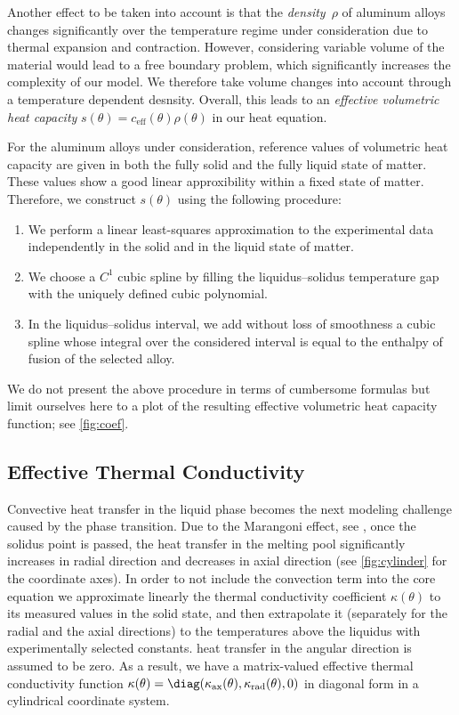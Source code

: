 Another effect to be taken into account is that the \emph{density}~$\rho$ of aluminum alloys changes significantly over the temperature regime under consideration due to thermal expansion and contraction.
However, considering variable volume of the material would lead to a free boundary problem, which significantly increases the complexity of our model.
We therefore take volume changes into account through a temperature dependent desnsity.
Overall, this leads to an \emph{effective volumetric heat capacity} $s(\theta) = c_\text{eff}(\theta) \rho(\theta)$ in our heat equation.

For the aluminum alloys under consideration, reference values of volumetric heat capacity are given in both the fully solid and the fully liquid state of matter. 
These values show a good linear approxibility within a fixed state of matter. 
Therefore, we construct $s(\theta)$ using the following procedure:
\begin{enumerate}
	\item 
		We perform a linear least-squares approximation to the experimental data independently in the solid and in the liquid state of matter.
	\item 
		We choose a $C^1$ cubic spline by filling the liquidus--solidus temperature gap with the uniquely defined cubic polynomial.
	\item 
		In the liquidus--solidus interval, we add without loss of smoothness a cubic spline whose integral over the considered interval is equal to the enthalpy of fusion of the selected alloy.
\end{enumerate}

We do not present the above procedure in terms of cumbersome formulas but limit ourselves here to a plot of the resulting effective volumetric heat capacity function; see \cref{fig:coef}.


\subsection{Effective Thermal Conductivity}
\label{subsec:conductivity}

Convective heat transfer in the liquid phase becomes the next modeling challenge caused by the phase transition. 
Due to the Marangoni effect, see \cite{MillsKeeneBrooksShirali:1998:1,Saldi:2012:1}, once the solidus point is passed, the heat transfer in the melting pool significantly increases in radial direction and decreases in axial direction (see \cref{fig:cylinder} for the coordinate axes).
In order to not include the convection term into the core equation we approximate linearly the thermal conductivity coefficient $\kappa(\theta)$ to its measured values in the solid state, and then extrapolate it (separately for the radial and the axial directions) to the temperatures above the liquidus with experimentally selected constants. 
 heat transfer in the angular direction is assumed to be zero.
As a result, we have a matrix-valued effective thermal conductivity function $\kappa(\theta) = \diag(\kappa_\text{ax}(\theta), \kappa_\text{rad}(\theta), 0)$ in diagonal form in a cylindrical coordinate system.

